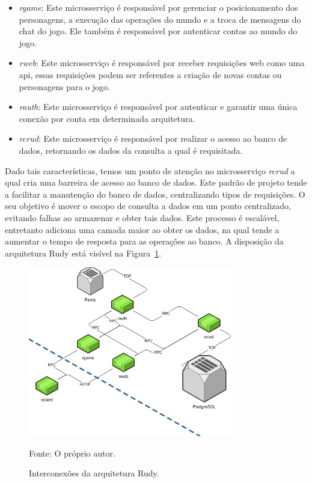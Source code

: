 \begin{itemize}
  \item \textit{rgame}: Este microsserviço é responsável por gerenciar o posicionamento dos personagens, a execução das operações do mundo e a troca de mensagens do chat do jogo. Ele também é responsável por autenticar contas ao mundo do jogo.
  \item \textit{rweb}: Este microsserviço é responsável por receber requisições web como uma \ac{api}, essas requisições podem ser referentes a criação de novas contas ou personagens para o jogo.
  \item \textit{rauth}: Este microsserviço é responsável por autenticar e garantir uma única conexão por conta em determinada arquitetura.
  \item \textit{rcrud}: Este microsserviço é responsável por realizar o acesso ao banco de dados, retornando os dados da consulta a qual é requisitada.
\end{itemize}



Dado tais características, temos um ponto de atenção no microsserviço \textit{rcrud} a qual cria uma barreira de acesso ao banco de dados.
%
Este padrão de projeto tende a facilitar a manutenção do banco de dados, centralizando tipos de requisições.
%
O seu objetivo é mover o escopo de consulta a dados em um ponto centralizado, evitando falhas ao armazenar e obter tais dados.
%
Este processo é escalável, entretanto adiciona uma camada maior ao obter os dados, na qual tende a aumentar o tempo de resposta para as operações ao banco.
%
A disposição da arquitetura Rudy está visível na Figura~\ref{fig:interconexao_rudy}.



\begin{figure}[htb!]
  \caption{Interconexões da arquitetura Rudy.}
  \label{fig:interconexao_rudy}
  \includegraphics[width=0.8\textwidth]{figuras/interconexoes/rudy.png}
  \centering

  Fonte: O próprio autor.
\end{figure}



